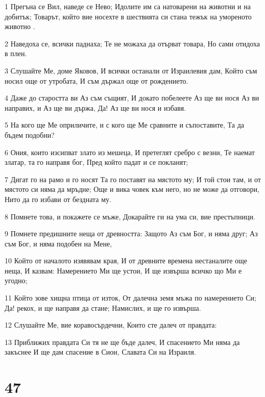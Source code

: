 \par 1 Прегъна се Вил, наведе се Нево; Идолите им са натоварени на животни и на добитък; Товарът, който вие носехте в шествията си стана тежък на умореното животно .
\par 2 Наведоха се, всички паднаха; Те не можаха да отърват товара, Но сами отидоха в плен.
\par 3 Слушайте Ме, доме Яковов, И всички останали от Израилевия дам, Който съм носил още от утробата, И съм държал още от рождението.
\par 4 Даже до старостта ви Аз съм същият, И докато побелеете Аз ще ви нося Аз ви направих, и Аз ще ви държа, Да! Аз ще ви нося и избавя.
\par 5 На кого ще Ме оприличите, и с кого ще Ме сравните и съпоставите, Та да бъдем подобни?
\par 6 Ония, които изсипват злато из мешеца, И претеглят сребро с везни, Те наемат златар, та го направя бог, Пред който падат и се покланят;
\par 7 Дигат го на рамо и го носят Та го поставят на мястото му; И той стои там, и от мястото си няма да мръдне; Още и вика човек към него, но не може да отговори, Нито да го избави от бездната му.
\par 8 Помнете това, и покажете се мъже, Докарайте ги на ума си, вие престъпници.
\par 9 Помнете предишните неща от древността: Защото Аз съм Бог, и няма друг; Аз съм Бог, и няма подобен на Мене,
\par 10 Който от началото изявявам края, И от древните времена нестаналите още неща, И казвам: Намерението Ми ще устои, И ще извърша всичко що Ми е угодно;
\par 11 Който зове хищна птица от изток, От далечна земя мъжа по намерението Си; Да! рекох, и ще направя да стане; Намислих, и ще го извърша.
\par 12 Слушайте Ме, вие коравосърдечни, Които сте далеч от правдата:
\par 13 Приближих правдата Си тя не ще бъде далеч, И спасението Ми няма да закъснее И ще дам спасение в Сион, Славата Си на Израиля.

\chapter{47}

